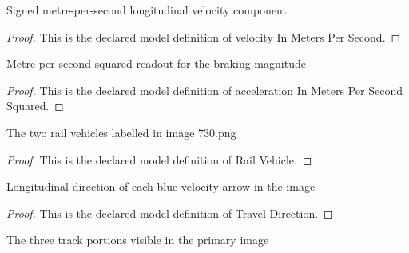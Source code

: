 \begin{definition}
  \label{def:physics:phyx-mini-0730:phyxminiproblems-problemphyxmini0730-velocityinmeterspersecond}
  Signed metre-per-second longitudinal velocity component
\end{definition}
\begin{proof}
  This is the declared model definition of velocity In Meters Per Second.
\end{proof}
\begin{definition}
  \label{def:physics:phyx-mini-0730:phyxminiproblems-problemphyxmini0730-accelerationinmeterspersecondsquared}
  Metre-per-second-squared readout for the braking magnitude
\end{definition}
\begin{proof}
  This is the declared model definition of acceleration In Meters Per Second Squared.
\end{proof}
\begin{definition}
  \label{def:physics:phyx-mini-0730:phyxminiproblems-problemphyxmini0730-railvehicle}
  The two rail vehicles labelled in image 730.png
\end{definition}
\begin{proof}
  This is the declared model definition of Rail Vehicle.
\end{proof}
\begin{definition}
  \label{def:physics:phyx-mini-0730:phyxminiproblems-problemphyxmini0730-traveldirection}
  Longitudinal direction of each blue velocity arrow in the image
\end{definition}
\begin{proof}
  This is the declared model definition of Travel Direction.
\end{proof}
\begin{definition}
  \label{def:physics:phyx-mini-0730:phyxminiproblems-problemphyxmini0730-trackregion}
  The three track portions visible in the primary image
\end{definition}
